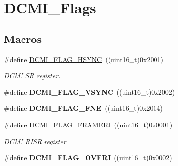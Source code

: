 \hypertarget{group___d_c_m_i___flags}{}\section{D\+C\+M\+I\+\_\+\+Flags}
\label{group___d_c_m_i___flags}
\subsection*{Macros}
\begin{DoxyCompactItemize}
\item 
\hypertarget{group___d_c_m_i___flags_gaf0137c6fe1d4f62e3197a1525ccd4576}{}\#define \hyperlink{group___d_c_m_i___flags_gaf0137c6fe1d4f62e3197a1525ccd4576}{D\+C\+M\+I\+\_\+\+F\+L\+A\+G\+\_\+\+H\+S\+Y\+N\+C}~((uint16\+\_\+t)0x2001)\label{group___d_c_m_i___flags_gaf0137c6fe1d4f62e3197a1525ccd4576}

\begin{DoxyCompactList}\small\item\em D\+C\+M\+I S\+R register. \end{DoxyCompactList}\item 
\hypertarget{group___d_c_m_i___flags_ga7ae4108d63dc1148222a50f84fd3af4f}{}\#define {\bfseries D\+C\+M\+I\+\_\+\+F\+L\+A\+G\+\_\+\+V\+S\+Y\+N\+C}~((uint16\+\_\+t)0x2002)\label{group___d_c_m_i___flags_ga7ae4108d63dc1148222a50f84fd3af4f}

\item 
\hypertarget{group___d_c_m_i___flags_ga9fe6ca35ea558baf07ff85cc6d9d3394}{}\#define {\bfseries D\+C\+M\+I\+\_\+\+F\+L\+A\+G\+\_\+\+F\+N\+E}~((uint16\+\_\+t)0x2004)\label{group___d_c_m_i___flags_ga9fe6ca35ea558baf07ff85cc6d9d3394}

\item 
\hypertarget{group___d_c_m_i___flags_gab882a0ef2f660db5dcd1d12eff39f653}{}\#define \hyperlink{group___d_c_m_i___flags_gab882a0ef2f660db5dcd1d12eff39f653}{D\+C\+M\+I\+\_\+\+F\+L\+A\+G\+\_\+\+F\+R\+A\+M\+E\+R\+I}~((uint16\+\_\+t)0x0001)\label{group___d_c_m_i___flags_gab882a0ef2f660db5dcd1d12eff39f653}

\begin{DoxyCompactList}\small\item\em D\+C\+M\+I R\+I\+S\+R register. \end{DoxyCompactList}\item 
\hypertarget{group___d_c_m_i___flags_ga10e986f24ca3e73d31f56ddd908987e0}{}\#define {\bfseries D\+C\+M\+I\+\_\+\+F\+L\+A\+G\+\_\+\+O\+V\+F\+R\+I}~((uint16\+\_\+t)0x0002)\label{group___d_c_m_i___flags_ga10e986f24ca3e73d31f56ddd908987e0}


\end{DoxyCompactItemize}
